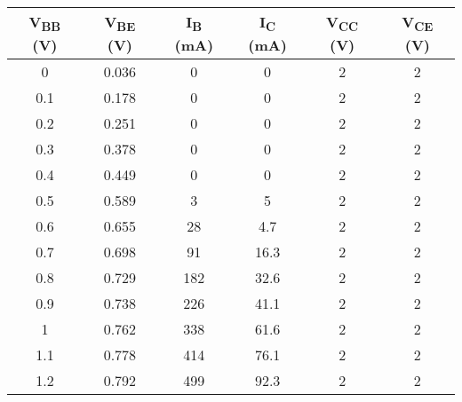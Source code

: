 \documentclass{scrartcl}
\begin{document}
\begin{table}[H]
    \centering
    \begin{tabular}{|c|c|c|c|c|c|}
        \hline
    \textbf{V\textsubscript{BB} (V)}  & \textbf{V\textsubscript{BE} (V)} &\textbf{I\textsubscript{B} (mA)} & \textbf{I\textsubscript{C} (mA)} & \textbf{V\textsubscript{CC} (V)} &  \textbf{V\textsubscript{CE} (V)} \\
    \hline 
    0         & 0.036     & 0            & 0            & 2     & 2             \\ \hline
    0.1       & 0.178     & 0            & 0            & 2     & 2             \\ \hline
    0.2       & 0.251     & 0            & 0            & 2     & 2             \\ \hline
    0.3       & 0.378     & 0            & 0            & 2     & 2             \\ \hline
    0.4       & 0.449     & 0            & 0            & 2     & 2             \\ \hline
    0.5       & 0.589     & 3            & 5            & 2     & 2             \\ \hline
    0.6       & 0.655     & 28           & 4.7          & 2     & 2             \\ \hline 
    0.7       & 0.698     & 91           & 16.3         & 2     & 2             \\ \hline
    0.8       & 0.729     & 182          & 32.6         & 2     & 2             \\ \hline
    0.9       & 0.738     & 226          & 41.1         & 2     & 2             \\ \hline
    1         & 0.762     & 338          & 61.6         & 2     & 2             \\ \hline 
    1.1       & 0.778     & 414          & 76.1         & 2     & 2             \\ \hline
    1.2       & 0.792     & 499          & 92.3         & 2     & 2             \\ 
    \hline
    \end{tabular}
    \end{table}
\end{document}
